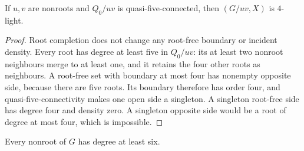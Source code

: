 \begin{lemma}\label{rh:quasi-light}
If $u,v$ are nonroots and $Q_0/uv$ is quasi-five-connected, then
$(G/uv,X)$ is $4$-light.
\end{lemma}

\begin{proof}
Root completion does not change any root-free boundary or incident
density. Every root has degree at least five in $Q_0/uv$: its at least
two nonroot neighbours merge to at least one, and it retains the four
other roots as neighbours. A root-free set with boundary at most four
has nonempty opposite side, because there are five roots. Its boundary
therefore has order four, and quasi-five-connectivity makes one open
side a singleton. A singleton root-free side has degree four and
density zero. A singleton opposite side would be a root of degree at
most four, which is impossible.
\end{proof}

\begin{lemma}\label{rh:degree-six}
Every nonroot of $G$ has degree at least six.
\end{lemma}

